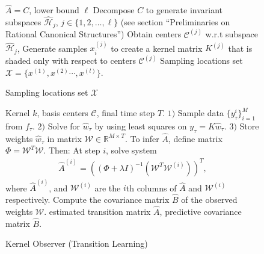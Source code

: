 \documentclass[letterpaper,12pt,peerreviewca,draftcls]{IEEEtran}
\newcommand{\la}{\lambda}
\newcommand{\R}{\mathbb{R}}
\newcommand{\W}{\mathcal{W}}
\newcommand{\estweight}{\widehat{w}}
\newcommand{\fspace}{\mathcal{H}}
\newcommand{\kernel}{k}
\newcommand{\meas}{y}
\newcommand{\empK}{\ensuremath{K}}
\newcommand{\sampSet}{\mathcal{X}}
\newcommand{\ncent}{M}
\newcommand{\shCent}{\mathcal{C}}
\newcommand{\fspaceApprox}{\widehat{\fspace}}
\newcommand{\obsMat}{\empK}
\newcommand{\minmeas}{\ell}
\newcommand{\fsubspaceC}[1]{\fspaceApprox_{#1}}
\newcommand{\dualop}{A}
\newcommand{\dualopApprox}{\widehat{\dualop}}
\newcommand{\tindex}{\tau}
\newcommand{\ftime}{T}
\newcommand{\estcontrolop}{\widehat{B}}
\newcommand{\FrobC}{C}
\begin{document}
\begin{figure}[t!]
	\begin{algorithm}[H]
		\caption{Sampling locations set $ \sampSet $}
		\label{alg:samples}
		\begin{algorithmic}
				 $ \dualopApprox =\FrobC $, lower bound $\minmeas$
				\STATE Decompose $ \FrobC $ to generate invariant subspaces $ \fsubspaceC{j} $, $ j\in \{1,2,\dots,\minmeas\} $ (see section ``Preliminaries on Rational Canonical Structures'')
				\FOR{$j=1$ {\bfseries to} $\minmeas$}
				\STATE Obtain centers $\shCent^{(j)}$ w.r.t subspace $ \fsubspaceC{j} $,
				\STATE Generate samples $x_i^{(j)}$ to create a kernel matrix $\empK^{(j)}$ that is shaded only with respect to centers $\shCent^{(j)}$
				\ENDFOR
				 Sampling locations set  $\sampSet =\{x^{(1)}, x^{(2)}\cdots,x^{(l)}\} $.
		\end{algorithmic}
	\end{algorithm}
\end{figure}

\begin{figure}[t!]
	\centering
	\begin{algorithm}[H]
		\caption{Kernel Observer (Transition Learning)}
		\label{alg:egp_trans}
		\begin{algorithmic}
				 Kernel $\kernel$, basis centers $\shCent$, final time 
				step $\ftime$. 
				\WHILE{$\tindex \leq \ftime$}
				\STATE $1)$ Sample data $\{y^i_{\tindex}\}_{i=1}^{\ncent}$ from $f_{\tindex}$. 
				\STATE $2)$ Solve for $\estweight_\tindex$ by using least squares on $\meas_{\tindex} = \obsMat \estweight_{\tindex}$. 
				\STATE $3)$ Store weights $\estweight_\tindex$ in matrix $\W\in\R^{\ncent\times \ftime}$.
				\ENDWHILE
				\STATE To infer $\dualopApprox$, define matrix $\Phi = \W^T\W$. Then:
				\FOR{$i=1$ {\bfseries to} $\ncent$}
				\STATE At step $i$, solve system
				\begin{align}
				\dualopApprox^{(i)} = \left(\left(\Phi + \la I\right)^{-1}(\W^T\W^{(i)})\right)^T,
				\end{align}
				where $\dualopApprox^{(i)}$, and $\W^{(i)}$ are the $i$th columns of $\dualopApprox$ and $\W^{(i)}$ respectively. 
				\ENDFOR
				\STATE Compute the covariance matrix  $\estcontrolop$ of the observed 
				weights $\W$. 
				 estimated transition matrix $\dualopApprox$, predictive covariance    
				matrix $\estcontrolop$. 
		\end{algorithmic}
	\end{algorithm}
	\vspace{-0.3in}
\end{figure}
\end{document}
